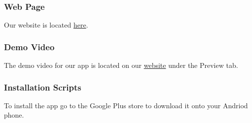 \subsubsection{Web Page}
Our website is located \href{https://sd2.000webhostapp.com/}{here}.

\subsubsection{Demo Video}
The demo video for our app is located on our \href{https://sd2.000webhostapp.com/}{website} under the Preview tab.





\subsubsection{Installation Scripts}
To install the app go to the Google Plus store to download it onto your Andriod phone.

